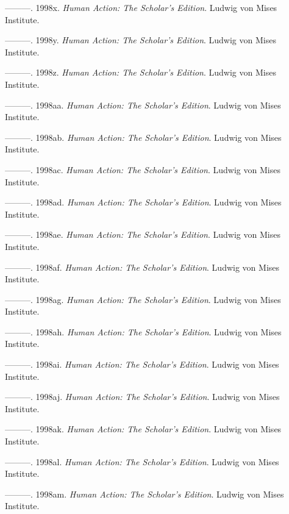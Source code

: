 \documentclass[
  a5paper,
  smalldemyvopaper,11pt,twoside,onecolumn,openright,extrafontsizes,
hidelinks]{memoir}
\newlength{\cslhangindent}
\newenvironment{CSLReferences}[2] %
 {\begin{list}{}{%
  \setlength{\itemindent}{0pt}
  \setlength{\leftmargin}{0pt}
  \setlength{\parsep}{0pt}
  \ifodd #1
   \setlength{\leftmargin}{\cslhangindent}
   \setlength{\itemindent}{-1\cslhangindent}
  \fi
  \setlength{\itemsep}{#2\baselineskip}}}
 {\end{list}}
\begin{document}
\begin{CSLReferences}{1}{0}
---------. 1998x. \emph{Human Action: The Scholar's Edition}. Ludwig von
Mises Institute.

---------. 1998y. \emph{Human Action: The Scholar's Edition}. Ludwig von
Mises Institute.

---------. 1998z. \emph{Human Action: The Scholar's Edition}. Ludwig von
Mises Institute.

---------. 1998aa. \emph{Human Action: The Scholar's Edition}. Ludwig
von Mises Institute.

---------. 1998ab. \emph{Human Action: The Scholar's Edition}. Ludwig
von Mises Institute.

---------. 1998ac. \emph{Human Action: The Scholar's Edition}. Ludwig
von Mises Institute.

---------. 1998ad. \emph{Human Action: The Scholar's Edition}. Ludwig
von Mises Institute.

---------. 1998ae. \emph{Human Action: The Scholar's Edition}. Ludwig
von Mises Institute.

---------. 1998af. \emph{Human Action: The Scholar's Edition}. Ludwig
von Mises Institute.

---------. 1998ag. \emph{Human Action: The Scholar's Edition}. Ludwig
von Mises Institute.

---------. 1998ah. \emph{Human Action: The Scholar's Edition}. Ludwig
von Mises Institute.

---------. 1998ai. \emph{Human Action: The Scholar's Edition}. Ludwig
von Mises Institute.

---------. 1998aj. \emph{Human Action: The Scholar's Edition}. Ludwig
von Mises Institute.

---------. 1998ak. \emph{Human Action: The Scholar's Edition}. Ludwig
von Mises Institute.

---------. 1998al. \emph{Human Action: The Scholar's Edition}. Ludwig
von Mises Institute.

---------. 1998am. \emph{Human Action: The Scholar's Edition}. Ludwig
von Mises Institute.


\end{CSLReferences}
\end{document}
